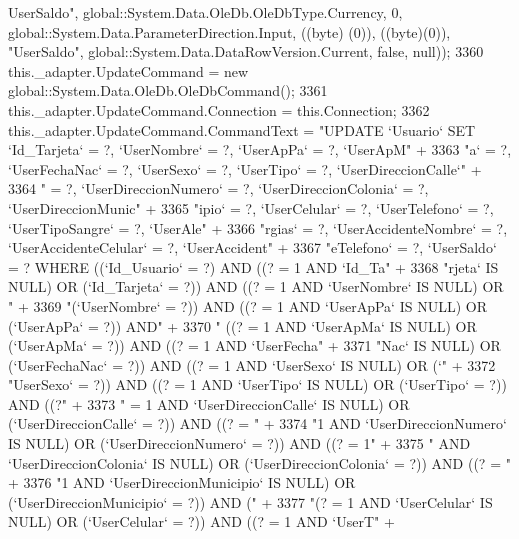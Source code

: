 \begin{DoxyCode}
{      UserSaldo"}, global::System.Data.OleDb.OleDbType.Currency, 0, global::System.Data.ParameterDirection.Input, ((byte)
      (0)), ((byte)(0)), \textcolor{stringliteral}{"UserSaldo"}, global::System.Data.DataRowVersion.Current, \textcolor{keyword}{false}, null));
3360             this.\_adapter.UpdateCommand = \textcolor{keyword}{new} global::System.Data.OleDb.OleDbCommand();
3361             this.\_adapter.UpdateCommand.Connection = this.Connection;
3362             this.\_adapter.UpdateCommand.CommandText = \textcolor{stringliteral}{"UPDATE `Usuario` SET `Id\_Tarjeta` = ?, `UserNombre`
       = ?, `UserApPa` = ?, `UserApM"} +
3363                 \textcolor{stringliteral}{"a` = ?, `UserFechaNac` = ?, `UserSexo` = ?, `UserTipo` = ?, `UserDireccionCalle`"} +
3364                 \textcolor{stringliteral}{" = ?, `UserDireccionNumero` = ?, `UserDireccionColonia` = ?, `UserDireccionMunic"} +
3365                 \textcolor{stringliteral}{"ipio` = ?, `UserCelular` = ?, `UserTelefono` = ?, `UserTipoSangre` = ?, `UserAle"} +
3366                 \textcolor{stringliteral}{"rgias` = ?, `UserAccidenteNombre` = ?, `UserAccidenteCelular` = ?, `UserAccident"} +
3367                 \textcolor{stringliteral}{"eTelefono` = ?, `UserSaldo` = ? WHERE ((`Id\_Usuario` = ?) AND ((? = 1 AND `Id\_Ta"} +
3368                 \textcolor{stringliteral}{"rjeta` IS NULL) OR (`Id\_Tarjeta` = ?)) AND ((? = 1 AND `UserNombre` IS NULL) OR "} +
3369                 \textcolor{stringliteral}{"(`UserNombre` = ?)) AND ((? = 1 AND `UserApPa` IS NULL) OR (`UserApPa` = ?)) AND"} +
3370                 \textcolor{stringliteral}{" ((? = 1 AND `UserApMa` IS NULL) OR (`UserApMa` = ?)) AND ((? = 1 AND `UserFecha"} +
3371                 \textcolor{stringliteral}{"Nac` IS NULL) OR (`UserFechaNac` = ?)) AND ((? = 1 AND `UserSexo` IS NULL) OR (`"} +
3372                 \textcolor{stringliteral}{"UserSexo` = ?)) AND ((? = 1 AND `UserTipo` IS NULL) OR (`UserTipo` = ?)) AND ((?"} +
3373                 \textcolor{stringliteral}{" = 1 AND `UserDireccionCalle` IS NULL) OR (`UserDireccionCalle` = ?)) AND ((? = "} +
3374                 \textcolor{stringliteral}{"1 AND `UserDireccionNumero` IS NULL) OR (`UserDireccionNumero` = ?)) AND ((? = 1"} +
3375                 \textcolor{stringliteral}{" AND `UserDireccionColonia` IS NULL) OR (`UserDireccionColonia` = ?)) AND ((? = "} +
3376                 \textcolor{stringliteral}{"1 AND `UserDireccionMunicipio` IS NULL) OR (`UserDireccionMunicipio` = ?)) AND ("} +
3377                 \textcolor{stringliteral}{"(? = 1 AND `UserCelular` IS NULL) OR (`UserCelular` = ?)) AND ((? = 1 AND `UserT"} +

\end{DoxyCode}
